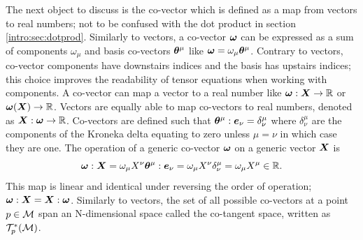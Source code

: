 The next object to discuss is the co-vector which is defined as a map from vectors to real numbers; not to be confused with the dot product in section \ref{intro:sec:dotprod}. Similarly to vectors, a co-vector $\boldsymbol{\omega}$ can be expressed as a sum of components $\omega_\mu$ and basis co-vectors $\boldsymbol{\theta}^\mu$ like $\boldsymbol{\omega} = \omega_\mu \boldsymbol{\theta}^\mu$. Contrary to vectors, co-vector components have downstairs indices and the basis has upstairs indices; this choice improves the readability of tensor equations when working with components. A co-vector can map a vector to a real number like $\boldsymbol{\omega}:\boldsymbol{X} \rightarrow \mathbb{R}$ or $\boldsymbol{\omega}(\boldsymbol{X}) \rightarrow \mathbb{R}$. Vectors are equally able to map co-vectors to real numbers, denoted as $\boldsymbol{X}:\boldsymbol{\omega}\rightarrow\mathbb{R}$. Co-vectors are defined such that $\boldsymbol{\theta}^\mu : \boldsymbol{e}_\nu = \delta^\mu_\nu$ where $\delta^\mu_\nu$ are the components of the Kroneka delta equating to zero unless $\mu=\nu$ in which case they are one. The operation of a generic co-vector $\boldsymbol{\omega}$ on a generic vector $\boldsymbol{X}$ is
\begin{equation}
\boldsymbol{\omega}: \boldsymbol{X} = \omega_\mu X^\nu \boldsymbol{\theta}^\mu:\boldsymbol{e}_\nu = \omega_\mu X^\nu \delta^\mu_\nu = \omega_\mu X^\mu \in \mathbb{R}.
\end{equation}
This map is linear and identical under reversing the order of operation; $\boldsymbol{\omega} : \boldsymbol{X} = \boldsymbol{X} : \boldsymbol{\omega}$. Similarly to vectors, the set of all possible co-vectors at a point $p\in\mathcal{M}$ span an N-dimensional space called the co-tangent space, written as $\mathcal{T}^*_p(\mathcal{M})$. 

